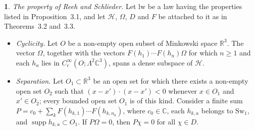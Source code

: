 \documentclass[11pt]{amsart}
\newcommand{\namedhead}{}
\theoremstyle{definition}
\newtheorem*{namedinner}{\namedhead}
\newenvironment{named}[1]{\renewcommand{\namedhead}{#1}\begin{namedinner}}{\end{namedinner}}
\begin{document}
\begin{named}{Proposition 3.6}
\emph{The property of Reeh and Schlieder.}
Let $\mathrm{lw}$ be a law having the properties listed in Proposition~3.1, and let $\mathcal H$, $\Omega$, $D$ and $F$ be attached to it as in Theorems~3.2 and~3.3.
\begin{itemize}
\item[(a)] \emph{Cyclicity.}
Let $O$ be a non-empty open subset of Minkowski space $\mathbb R^3$.
The vector $\Omega$, together with the vectors $F(h_1)\cdots F(h_n)\Omega$ for which $n\ge1$ and each $h_a$ lies in $C_c^\infty(O;\Lambda^2\mathbb C^3)$, spans a dense subspace of $\mathcal H$.
\item[(b)] \emph{Separation.}
Let $O_1\subset\mathbb R^3$ be an open set for which there exists a non-empty open set $O_2$ such that $(x-x')\cdot(x-x')<0$ whenever $x\in O_1$ and $x'\in O_2$; every bounded open set $O_1$ is of this kind.
Consider a finite sum $P=c_0+\sum_kF(h_{k,1})\cdots F(h_{k,n_k})$, where $c_0\in\mathbb C$, each $h_{k,a}$ belongs to $\mathrm{Sw}_1$, and $\operatorname{supp}h_{k,a}\subset O_1$.
If $P\Omega=0$, then $P\chi=0$ for all $\chi\in D$.
\end{itemize}
\end{named}
\end{document}
